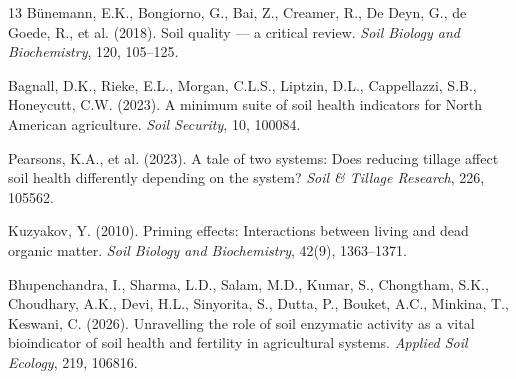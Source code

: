 \documentclass[english]{ai4science_ysda}
\begin{document}
\begin{thebibliography}{13}
Bünemann, E.K., Bongiorno, G., Bai, Z., Creamer, R., De Deyn, G., de Goede, R.,
et al. (2018). Soil quality --- a critical review. \emph{Soil Biology and
Biochemistry}, 120, 105--125.

Bagnall, D.K., Rieke, E.L., Morgan, C.L.S., Liptzin, D.L., Cappellazzi, S.B.,
Honeycutt, C.W. (2023). A minimum suite of soil health indicators for North
American agriculture. \emph{Soil Security}, 10, 100084.

Pearsons, K.A., et al. (2023). A tale of two systems: Does reducing tillage
affect soil health differently depending on the system? \emph{Soil \& Tillage
Research}, 226, 105562.

Kuzyakov, Y. (2010). Priming effects: Interactions between living and dead
organic matter. \emph{Soil Biology and Biochemistry}, 42(9), 1363--1371.

Bhupenchandra, I., Sharma, L.D., Salam, M.D., Kumar, S., Chongtham, S.K.,
Choudhary, A.K., Devi, H.L., Sinyorita, S., Dutta, P., Bouket, A.C.,
Minkina, T., Keswani, C. (2026). Unravelling the role of soil enzymatic
activity as a vital bioindicator of soil health and fertility in agricultural
systems. \emph{Applied Soil Ecology}, 219, 106816.
\end{thebibliography}
\end{document}
